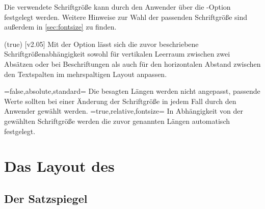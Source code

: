 \begin{DeclareEntity*}{}
\begin{DeclareEntity*}{}
\begin{DeclareEntity*}{}
Die verwendete Schriftgröße kann durch den Anwender über die \KOMAScript-Option 
 festgelegt werden.
Weitere Hinweise zur Wahl der passenden Schriftgröße sind außerdem in 
\autoref{sec:fontsize} zu finden.

\begin{Declaration}
  {}
  (true)
  [v2.05]
\printdeclarationlist
%
Mit der Option  lässt sich die zuvor beschriebene 
Schriftgrößenabhängigkeit sowohl für vertikalen Leerraum zwischen zwei Absätzen 
oder bei Beschriftungen als auch für den horizontalen Abstand zwischen den 
Textspalten im mehrspaltigen Layout anpassen.
%
\begin{DeclareValues}
\itemval=false,absolute,standard=
  Die besagten Längen werden nicht angepasst, passende Werte sollten bei einer 
  Änderung der Schriftgröße in jedem Fall durch den Anwender gewählt werden.
\itemval*=true,relative,fontsize=
  In Abhängigkeit von der gewählten Schriftgröße werden die zuvor genannten 
  Längen automatisch festgelegt.
\end{DeclareValues}
\end{Declaration}



\section{%
  Das Layout des \CDs%
}
\subsection{%
  Der Satzspiegel%
}

\end{DeclareEntity*}
\end{DeclareEntity*}
\end{DeclareEntity*}
